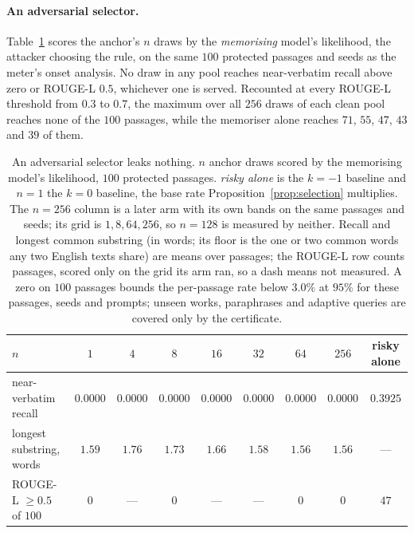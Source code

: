 \paragraph{An adversarial selector.}
Table~\ref{tab:extraction} scores the anchor's $n$ draws by the \emph{memorising} model's likelihood, the
attacker choosing the rule, on the same $100$ protected passages and seeds as the meter's onset analysis.
No draw in any pool reaches near-verbatim recall above zero or ROUGE-L $0.5$, whichever one is served.
Recounted at every ROUGE-L threshold from $0.3$ to $0.7$, the maximum over all $256$ draws of each clean
pool reaches none of the $100$ passages, while the memoriser alone reaches $71$, $55$, $47$, $43$ and $39$
of them.\label{app:rougethreshold}

\begin{table}[h]
\centering\footnotesize
\caption{An adversarial selector leaks nothing. $n$ anchor draws scored by the memorising model's
likelihood, $100$ protected passages. \emph{risky alone} is the $k=-1$ baseline and $n=1$ the $k=0$
baseline, the base rate Proposition~\ref{prop:selection} multiplies. The $n=256$ column is a later arm with its own
bands on the same passages and seeds; its grid is $1, 8, 64, 256$, so $n=128$ is measured by neither. Recall and longest common substring
(in words; its floor is the one or two common words any two English texts share) are means over
passages; the ROUGE-L row counts passages, scored only on the grid its arm ran, so a dash means not
measured. A zero on $100$ passages bounds the per-passage rate below $3.0\%$ at $95\%$ for these
passages, seeds and prompts; unseen works, paraphrases and adaptive queries are covered only by the
certificate.}
\label{tab:extraction}
\setlength{\tabcolsep}{4pt}
\begin{tabular}{@{}lcccccccc@{}}
\toprule
$n$ & $1$ & $4$ & $8$ & $16$ & $32$ & $64$ & $256$ & risky alone \\
\midrule
near-verbatim recall     & $0.0000$ & $0.0000$ & $0.0000$ & $0.0000$ & $0.0000$ & $0.0000$ & $0.0000$ & $0.3925$ \\
longest substring, words & $1.59$ & $1.76$ & $1.73$ & $1.66$ & $1.58$ & $1.56$ & $1.56$ & --- \\
ROUGE-L $\ge 0.5$ of $100$ & $0$ & --- & $0$ & --- & --- & $0$ & $0$ & $47$ \\
\bottomrule
\end{tabular}
\end{table}

